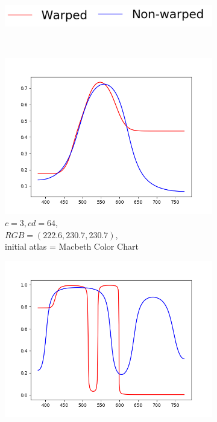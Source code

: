 \begin{figure}[t]
	\centering
	\captionsetup[subfigure]{font=footnotesize,labelfont=footnotesize}
	\captionsetup[subfigure]{justification=centering}
	\begin{subfigure}[t]{0.38\textwidth}
		\includegraphics[width=\linewidth]{img/resultsTechniqueOpt_legend.png}
	\end{subfigure} \\
	\begin{subfigure}[t]{0.31\textwidth}
		\includegraphics[width=\linewidth]{img/resultsTechniqueOpt_m3_cd64.png}
		\caption{$c=3, cd=64$,\\$RGB=(222.6, 230.7, 230.7)$,\\initial atlas = Macbeth Color Chart}
		\label{fig:warping_regularPointst_m3_cd64}
	\end{subfigure}
	\begin{subfigure}[t]{0.31\textwidth}
		\includegraphics[width=\linewidth]{img/resultsTechniqueOpt_m5_cd32.png}

\end{subfigure}
\end{figure}

